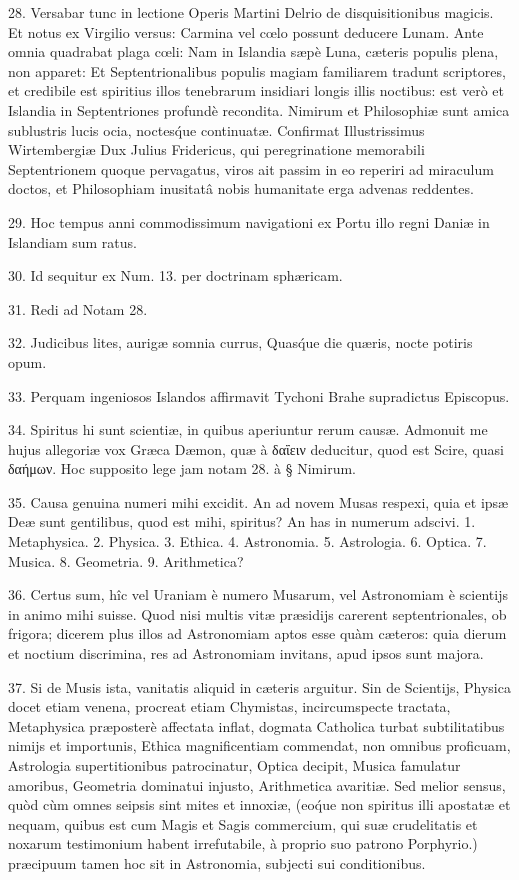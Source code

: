 \documentclass[a4paper, 11pt, oneside, polutonikogreek, german]{article}
\begin{document}
28. Versabar tunc in lectione Operis Martini Delrio de disquisitionibus magicis. Et notus ex Virgilio versus:\hspace*{5mm}
Carmina vel cœlo possunt deducere Lunam.\hspace*{5mm}
Ante omnia quadrabat plaga cœli: Nam in Islandia sæpè Luna, cæteris populis plena, non apparet: Et Septentrionalibus populis magiam familiarem tradunt scriptores, et credibile est spiritius illos tenebrarum insidiari longis illis noctibus: est verò et Islandia in Septentriones profundè recondita. Nimirum et Philosophiæ sunt amica sublustris lucis ocia, noctes\'que continuatæ. Confirmat Illustrissimus Wirtembergiæ Dux Julius Fridericus, qui peregrinatione memorabili Septentrionem quoque pervagatus, viros ait passim in eo reperiri ad miraculum doctos, et Philosophiam inusitatâ nobis humanitate erga advenas reddentes.

29. Hoc tempus anni commodissimum navigationi ex Portu illo regni Daniæ in Islandiam sum ratus.

30. Id sequitur ex Num. 13. per doctrinam sphæricam.

31. Redi ad Notam 28.

32. Judicibus lites, aurigæ somnia currus,
Quas\'que die quæris, nocte potiris opum.

33. Perquam ingeniosos Islandos affirmavit Tychoni Brahe supradictus Episcopus.

34. Spiritus hi sunt scientiæ, in quibus aperiuntur rerum causæ. Admonuit me hujus allegoriæ vox Græca Dæmon, quæ à δαΐειν deducitur, quod est Scire, quasi δαήμων. Hoc supposito lege jam notam 28. à § Nimirum.

35. Causa genuina numeri mihi excidit. An ad novem Musas respexi, quia et ipsæ Deæ sunt gentilibus, quod est mihi, spiritus? An has in numerum adscivi. 1. Metaphysica. 2. Physica. 3. Ethica. 4. Astronomia. 5. Astrologia. 6. Optica. 7. Musica. 8. Geometria. 9. Arithmetica?

36. Certus sum, hîc vel Uraniam è numero Musarum, vel Astronomiam è scientijs in animo mihi suisse. Quod nisi multis vitæ præsidijs carerent septentrionales, ob frigora; dicerem plus illos ad Astronomiam aptos esse quàm cæteros: quia dierum et noctium discrimina, res ad Astronomiam invitans, apud ipsos sunt majora.

37. Si de Musis ista, vanitatis aliquid in cæteris arguitur. Sin de Scientijs, Physica docet etiam venena, procreat etiam Chymistas, incircumspecte tractata, Metaphysica præposterè affectata inflat, dogmata Catholica turbat subtilitatibus nimijs et importunis, Ethica magnificentiam commendat, non omnibus proficuam, Astrologia supertitionibus patrocinatur, Optica decipit, Musica famulatur amoribus, Geometria dominatui injusto, Arithmetica avaritiæ. Sed melior sensus, quòd cùm omnes seipsis sint mites et innoxiæ, (eo\'que non spiritus illi apostatæ et nequam, quibus est cum Magis et Sagis commercium, qui suæ crudelitatis et noxarum testimonium habent irrefutabile, à proprio suo patrono Porphyrio.) præcipuum tamen hoc sit in Astronomia, subjecti sui conditionibus.
\end{document}
